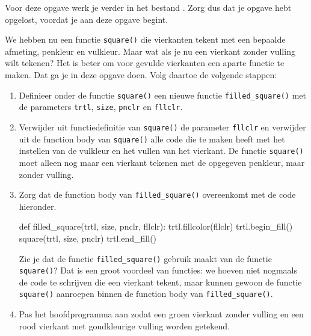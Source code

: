 \documentclass[../main]{subfiles}
\begin{document}
\begin{opgave}[icons={laptop}]
Voor deze opgave werk je verder in het bestand . Zorg dus dat je opgave \pgfmathresult{} hebt opgelost, voordat je aan deze opgave begint.

We hebben nu een functie \texttt{square()} die vierkanten tekent met een bepaalde afmeting, penkleur en vulkleur. Maar wat als je nu een vierkant zonder vulling wilt tekenen? Het is beter om voor gevulde vierkanten een aparte functie te maken. Dat ga je in deze opgave doen. Volg daartoe de volgende stappen:
\begin{enumerate}[left=0pt .. 2em, itemsep=0.5\baselineskip]
\item Definieer onder de functie \texttt{square()} een nieuwe functie \texttt{filled\_square()} met de parameters \texttt{trtl}, \texttt{size}, \texttt{pnclr} en \texttt{fllclr}.
\item Verwijder uit functiedefinitie van \texttt{square()} de parameter \texttt{fllclr} en verwijder uit de function body van \texttt{square()} alle code die te maken heeft met het instellen van de vulkleur en het vullen van het vierkant. De functie \texttt{square()} moet alleen nog maar een vierkant tekenen met de opgegeven penkleur, maar zonder vulling.
\item Zorg dat de function body van \texttt{filled\_square()} overeenkomt met de code hieronder.
\begin{python}[style=mu, numbers=none, aboveskip=.5\baselineskip]
def filled_square(trtl, size, pnclr, fllclr):
    trtl.fillcolor(fllclr)
    trtl.begin_fill()
    square(trtl, size, pnclr)
    trtl.end_fill()
\end{python}
Zie je dat de functie \texttt{filled\_square()} gebruik maakt van de functie \texttt{square()}? Dat is een groot voordeel van functies: we hoeven niet nogmaals de code te schrijven die een vierkant tekent, maar kunnen gewoon de functie \texttt{square()} aanroepen binnen de function body van \texttt{filled\_square()}.
\item Pas het hoofdprogramma aan zodat een groen vierkant zonder vulling en een rood vierkant met goudkleurige vulling worden getekend.
\end{enumerate}
\begin{center}
\end{center}
\end{opgave}
\end{document}
